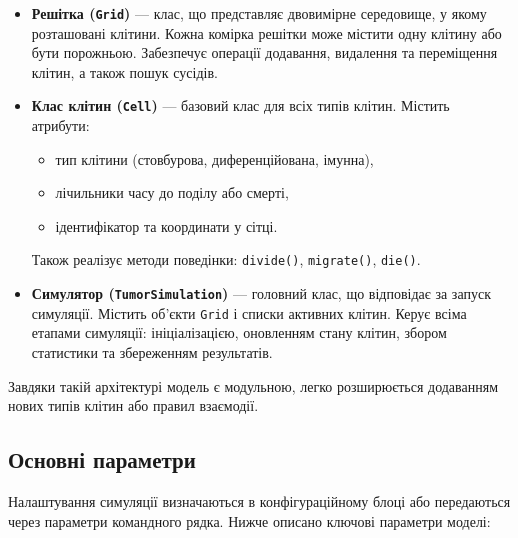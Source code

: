 \documentclass{article}
\begin{document}
\begin{itemize}
  \item \textbf{Решітка (\texttt{Grid})} --- клас, що представляє двовимірне середовище, у якому розташовані клітини. Кожна комірка решітки може містити одну клітину або бути порожньою. Забезпечує операції додавання, видалення та переміщення клітин, а також пошук сусідів.

  \item \textbf{Клас клітин (\texttt{Cell})} --- базовий клас для всіх типів клітин. Містить атрибути:
  \begin{itemize}
    \item тип клітини (стовбурова, диференційована, імунна),
    \item лічильники часу до поділу або смерті,
    \item ідентифікатор та координати у сітці.
  \end{itemize}
  Також реалізує методи поведінки: \texttt{divide()}, \texttt{migrate()}, \texttt{die()}.

  \item \textbf{Симулятор (\texttt{TumorSimulation})} --- головний клас, що відповідає за запуск симуляції. Містить об'єкти \texttt{Grid} і списки активних клітин. Керує всіма етапами симуляції: ініціалізацією, оновленням стану клітин, збором статистики та збереженням результатів.
\end{itemize}

Завдяки такій архітектурі модель є модульною, легко розширюється додаванням нових типів клітин або правил взаємодії.

\subsection{Основні параметри}

Налаштування симуляції визначаються в конфігураційному блоці або передаються через параметри командного рядка. Нижче описано ключові параметри моделі:
\end{document}
